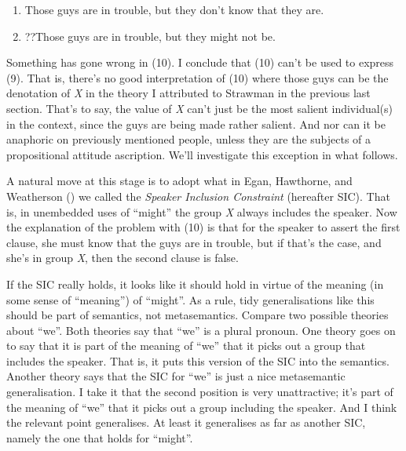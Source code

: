 \documentclass[
  10pt,
  letterpaper,
  DIV=11,
  numbers=noendperiod,
  twoside]{scrartcl}
\providecommand{\tightlist}{%
  \setlength{\itemsep}{0pt}\setlength{\parskip}{0pt}}\usepackage{longtable,booktabs,array}
\begin{document}
\begin{enumerate}
\def\labelenumi{\arabic{enumi}.}
\setcounter{enumi}{8}
\tightlist
\item
  Those guys are in trouble, but they don't know that they are.
\item
  ??Those guys are in trouble, but they might not be.
\end{enumerate}

Something has gone wrong in (10). I conclude that (10) can't be used to
express (9). That is, there's no good interpretation of (10) where those
guys can be the denotation of \emph{X} in the theory I attributed to
Strawman in the previous last section. That's to say, the value of
\emph{X} can't just be the most salient individual(s) in the context,
since the guys are being made rather salient. And nor can it be
anaphoric on previously mentioned people, unless they are the subjects
of a propositional attitude ascription. We'll investigate this exception
in what follows.

A natural move at this stage is to adopt what in Egan, Hawthorne, and
Weatherson () we called the
\emph{Speaker Inclusion Constraint} (hereafter SIC). That is, in
unembedded uses of ``might'' the group \emph{X} always includes the
speaker. Now the explanation of the problem with (10) is that for the
speaker to assert the first clause, she must know that the guys are in
trouble, but if that's the case, and she's in group \emph{X}, then the
second clause is false.

If the SIC really holds, it looks like it should hold in virtue of the
meaning (in some sense of ``meaning'') of ``might''. As a rule, tidy
generalisations like this should be part of semantics, not
metasemantics. Compare two possible theories about ``we''. Both theories
say that ``we'' is a plural pronoun. One theory goes on to say that it
is part of the meaning of ``we'' that it picks out a group that includes
the speaker. That is, it puts this version of the SIC into the
semantics. Another theory says that the SIC for ``we'' is just a nice
metasemantic generalisation. I take it that the second position is very
unattractive; it's part of the meaning of ``we'' that it picks out a
group including the speaker. And I think the relevant point generalises.
At least it generalises as far as another SIC, namely the one that holds
for ``might''.
\end{document}

